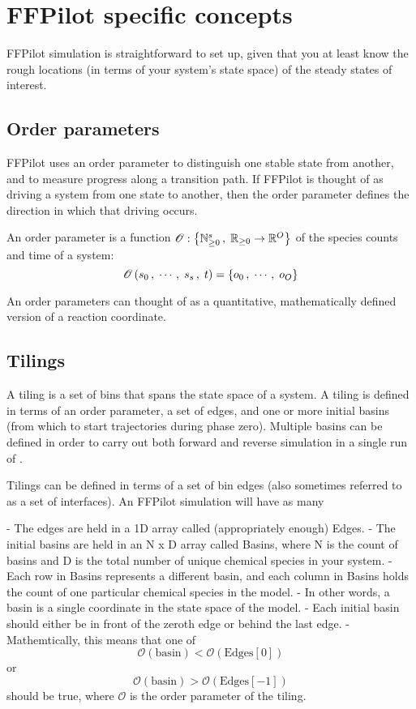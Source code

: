 \section{FFPilot specific concepts}

FFPilot simulation is straightforward to set up, given that you at least know the rough locations (in terms of your system's state space) of the steady states of interest.

\subsection{Order parameters}

FFPilot uses an order parameter to distinguish one stable state from another, and to measure progress along a transition path. If FFPilot is thought of as driving a system from one state to another, then the order parameter defines the direction in which that driving occurs.

An order parameter is a function $\mathscr{O}: \left\{ {\mathbb{N}}_{\geq 0}^s \,, \; {\mathbb{R}}_{\geq 0} \rightarrow \mathbb{R}^O \right\}$ of the species counts  and time of a system:
\begin{equation*}
    \mathscr{O} \left( s_{0} \,, \; \cdots \,, \; s_{s} \,, \; t \right) = \left\{ o_0 \,, \; \cdots \,, \; o_{O} \right\}
\end{equation*}

An order parameters can thought of as a quantitative, mathematically defined version of a reaction coordinate.

\subsection{Tilings}
A tiling is a set of bins that spans the state space of a system. A tiling is defined in terms of an order parameter, a set of edges, and one or more initial basins (from which to start trajectories during phase zero). Multiple basins can be defined in order to carry out both forward and reverse simulation in a single run of .

Tilings can be defined in terms of a set of bin edges (also sometimes referred to as a set of interfaces). An FFPilot simulation will have as many 


- The edges are held in a 1D array called (appropriately enough) Edges.
- The initial basins are held in an N x D array called Basins, where N is the count of basins and D is the total number of unique chemical species in your system.
    - Each row in Basins represents a different basin, and each column in Basins holds the count of one particular chemical species in the model.
        - In other words, a basin is a single coordinate in the state space of the model.
    - Each initial basin should either be in front of the zeroth edge or behind the last edge.
        - Mathemtically, this means that one of $$ \mathscr{O}(\text{basin}) < \mathscr{O}(\text{Edges}[0]) $$ or $$ \mathscr{O}(\text{basin}) > \mathscr{O}(\text{Edges}[-1]) $$ should be true, where $\mathscr{O}$ is the order parameter of the tiling.

